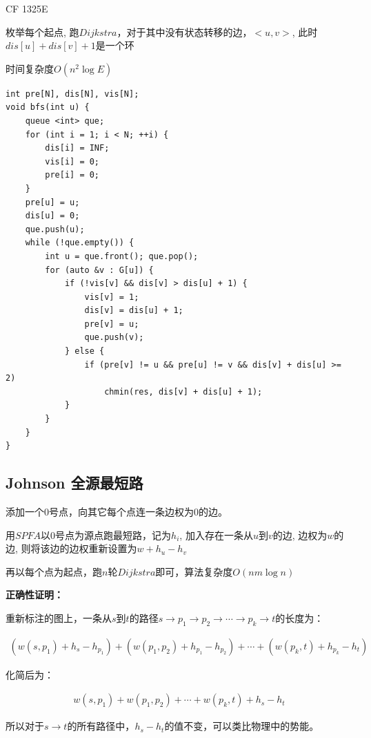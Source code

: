 CF 1325E\par
枚举每个起点, 跑$Dijkstra$，对于其中没有状态转移的边，$<u, v>$, 此时$dis[u] + dis[v] + 1$是一个环\par

时间复杂度$O(n^2 \log E)$

\begin{lstlisting}
int pre[N], dis[N], vis[N];
void bfs(int u) {
	queue <int> que;
	for (int i = 1; i < N; ++i) {
		dis[i] = INF;
		vis[i] = 0;
		pre[i] = 0;
	}
	pre[u] = u;
	dis[u] = 0;
	que.push(u);
	while (!que.empty()) {
		int u = que.front(); que.pop();
		for (auto &v : G[u]) {
			if (!vis[v] && dis[v] > dis[u] + 1) {
				vis[v] = 1;
				dis[v] = dis[u] + 1;
				pre[v] = u;
				que.push(v);
			} else {
				if (pre[v] != u && pre[u] != v && dis[v] + dis[u] >= 2) 
					chmin(res, dis[v] + dis[u] + 1); 
			} 
		}
	}
}
\end{lstlisting}

\subsection{Johnson 全源最短路}

添加一个$0$号点，向其它每个点连一条边权为$0$的边。\par
用$SPFA$以$0$号点为源点跑最短路，记为$h_i$, 加入存在一条从$u$到$v$的边, 边权为$w$的边, 则将该边的边权重新设置为$w + h_u - h_v$\par

再以每个点为起点，跑$n$轮$Dijkstra$即可，算法复杂度$O(nm \log n)$\par

\textbf{正确性证明：}\par

重新标注的图上，一条从$s$到$t$的路径$s \rightarrow p_1 \rightarrow p_2 \rightarrow \cdots \rightarrow p_k \rightarrow t$的长度为：

\begin{eqnarray*}
(w(s, p_1) + h_s - h_{p_1}) + (w(p_1, p_2) + h_{p_1} - h_{p_2}) + \cdots + (w(p_k, t) + h_{p_k} - h_t)
\end{eqnarray*}

化简后为：

\begin{eqnarray*}
w(s, p_1) + w(p_1, p_2) + \cdots + w(p_k, t) + h_s - h_t
\end{eqnarray*}

所以对于$s \rightarrow t$的所有路径中，$h_s - h_t$的值不变，可以类比物理中的势能。\par

